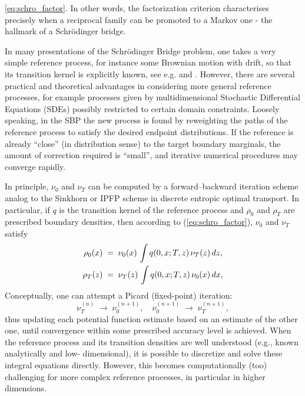 \documentclass[a4paper,11pt]{amsart}
\theoremstyle{plain}
\theoremstyle{remark}
\begin{document}
\eqref{eq:schro_factor}.  In other words, the factorization
criterion characterises precisely when a reciprocal family can be
promoted to a Markov one - the hallmark of a Schr\"odinger bridge.
\par
 In many presentations of the Schr\"odinger Bridge problem, one takes a very simple reference process, for instance some Brownian motion with drift, so that its transition kernel is explicitly known, see e.g. \cite{pooladian2024plug} and \cite{baptista2024conditional}. However, there are several practical and theoretical advantages in considering more general reference processes, for example processes given by multidimensional Stochastic Differential Equations (SDEs) possibly restricted  to certain domain constraints. 
 Loosely speaking,
 in the SBP the new process is found by reweighting the paths of the reference process to satisfy the desired endpoint distributions. If the reference is already ``close'' (in distribution sense) to the target boundary marginals, the amount of correction required is ``small'', and  iterative numerical procedures may converge  rapidly.  
\par
In principle, \(\nu_{0}\) and \(\nu_{T}\) can be computed by a forward--backward iteration scheme analog to the Sinkhorn or IPFP scheme in discrete entropic optimal transport.  In particular, if \(q\) is the transition kernel of the reference process and \(\rho_{0}\) and \(\rho_{T}\) are prescribed boundary densities, then according to (\ref{eq:schro_factor}), \(\nu_{0}\) and \(\nu_{T}\) satisfy
\begin{align}
\rho_{0}(x) \;&=\; \nu_{0}(x)\,\int q(0,x;T,z)\,\nu_{T}(z)\,dz,\notag \\
\rho_{T}(z) \;&=\; \nu_{T}(z)\,\int q(0,x;T,z)\,\nu_{0}(x)\,dx,\label{eq:se-intr}
\end{align}
Conceptually, one can attempt a Picard (fixed-point) iteration:
\begin{equation}\label{picit}
\nu_{T}^{(n)} \;\longrightarrow\; \nu_{0}^{(n+1)}, 
\quad
\nu_{0}^{(n+1)}\;\longrightarrow\; \nu_{T}^{(n+1)},
\end{equation}
thus updating each potential function estimate based on an estimate of the other one, until convergence within some prescribed accuracy level is achieved.  When the reference process and its transition densities are well understood (e.g., known analytically and  low- dimensional), it is possible to discretize and solve these integral equations directly.  However, this becomes computationally (too) challenging  for more complex reference processes, in particular in higher dimensions.
\par
\end{document}
